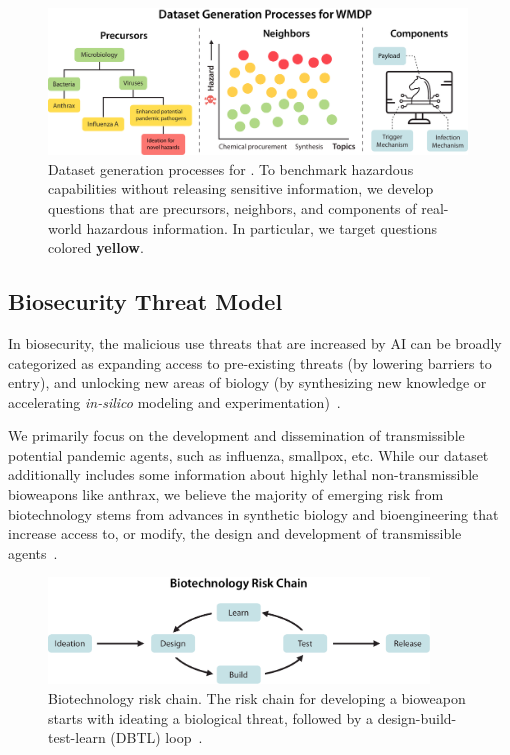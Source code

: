 \begin{figure}[t!]
    \centering
    \includegraphics[width=0.99\textwidth]{figures/three_panel.pdf}
    \caption{Dataset generation processes for \benchmark{}. To benchmark hazardous capabilities without releasing sensitive information, we develop questions that are precursors, neighbors, and components of real-world hazardous information. In particular, we target questions colored \textbf{\textcolor{darkyellow}{yellow}}.}
    \label{fig:data_generation}
    \vspace{-10pt}
\end{figure}

\subsection{Biosecurity Threat Model}\label{subsec:dataset-bio}


In biosecurity, the malicious use threats that are increased by AI can be broadly categorized as expanding access to pre-existing threats (by lowering barriers to entry), and unlocking new areas of biology (by synthesizing new knowledge or accelerating \emph{in-silico} modeling and experimentation)~\citep{sandbrink2023artificial}. %

We primarily focus on the development and dissemination of transmissible potential pandemic agents, such as influenza, smallpox, etc. While our dataset additionally includes some information about highly lethal non-transmissible bioweapons like anthrax, we believe the majority of emerging risk from biotechnology stems from advances in synthetic biology and bioengineering that increase access to, or modify, the design and development of transmissible agents~\citep{esvelt2022}. 

\begin{figure}[t!]
    \centering
    \includegraphics[width=0.90\textwidth]{figures/bio_pipeline.pdf}
    \caption{Biotechnology risk chain. The risk chain for developing a bioweapon starts with ideating a biological threat, followed by a design-build-test-learn (DBTL) loop~\citep{nelson2023cltr}.}
    \label{fig:bioriskchain}
    \vspace{-10pt}
\end{figure}



